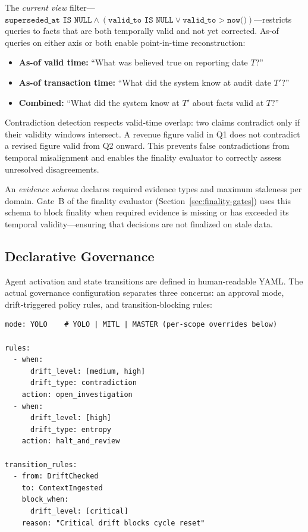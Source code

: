 \documentclass[11pt]{article}
\begin{document}
The \emph{current view} filter---$\texttt{superseded\_at IS NULL} \wedge (\texttt{valid\_to IS NULL} \vee \texttt{valid\_to} > \texttt{now()})$---restricts queries to facts that are both temporally valid and not yet corrected. As-of queries on either axis or both enable point-in-time reconstruction:

\begin{itemize}
  \item \textbf{As-of valid time:} ``What was believed true on reporting date $T$?''
  \item \textbf{As-of transaction time:} ``What did the system know at audit date $T'$?''
  \item \textbf{Combined:} ``What did the system know at $T'$ about facts valid at $T$?''
\end{itemize}

Contradiction detection respects valid-time overlap: two claims contradict only if their validity windows intersect. A revenue figure valid in Q1 does not contradict a revised figure valid from Q2 onward. This prevents false contradictions from temporal misalignment and enables the finality evaluator to correctly assess unresolved disagreements.

An \emph{evidence schema} declares required evidence types and maximum staleness per domain. Gate~B of the finality evaluator (Section~\ref{sec:finality-gates}) uses this schema to block finality when required evidence is missing or has exceeded its temporal validity---ensuring that decisions are not finalized on stale data.

\subsection{Declarative Governance}
\label{sec:declarative-governance}

Agent activation and state transitions are defined in human-readable YAML. The actual governance configuration separates three concerns: an approval mode, drift-triggered policy rules, and transition-blocking rules:

\begin{lstlisting}
mode: YOLO    # YOLO | MITL | MASTER (per-scope overrides below)

rules:
  - when:
      drift_level: [medium, high]
      drift_type: contradiction
    action: open_investigation
  - when:
      drift_level: [high]
      drift_type: entropy
    action: halt_and_review

transition_rules:
  - from: DriftChecked
    to: ContextIngested
    block_when:
      drift_level: [critical]
    reason: "Critical drift blocks cycle reset"
\end{lstlisting}
\end{document}
